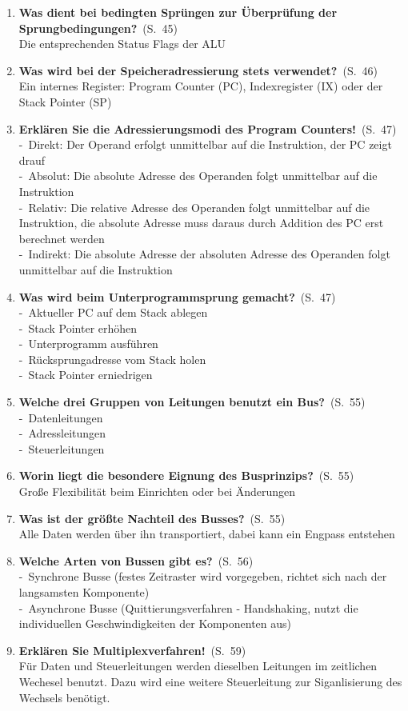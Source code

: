 \documentclass[a4paper,12pt]{article}
\newcommand{\question}[3]{\pagebreak[3]\item {\textbf{#1?}}\ (S.\ #2)#3}
\newcommand{\statement}[3]{\pagebreak[3]\item {\textbf{#1!}}\ (S.\ #2)#3}
\newcommand{\catchword}[1]{\\-\ #1}
\newcommand{\normaltext}[1]{\\#1}
\newcommand{\page}[1]{#1}
\begin{document}
\begin{enumerate}
  \question{Was dient bei bedingten Sprüngen zur Überprüfung der Sprungbedingungen}{\page{45}}
  {
    \normaltext{Die entsprechenden Status Flags der ALU}
  }

  \question{Was wird bei der Speicheradressierung stets verwendet}{\page{46}}
  {
    \normaltext{Ein internes Register: Program Counter (PC), Indexregister (IX)
                oder der Stack Pointer (SP)}
  }

  \statement{Erklären Sie die Adressierungsmodi des Program Counters}{\page{47}}
  {
    \catchword{Direkt: Der Operand erfolgt unmittelbar auf die Instruktion, der PC zeigt drauf}
    \catchword{Absolut: Die absolute Adresse des Operanden folgt unmittelbar auf die Instruktion}
    \catchword{Relativ: Die relative Adresse des Operanden folgt unmittelbar auf die Instruktion,
               die absolute Adresse muss daraus durch Addition des PC erst berechnet werden}
    \catchword{Indirekt: Die absolute Adresse der absoluten Adresse des Operanden folgt unmittelbar
               auf die Instruktion}
  }

  \question{Was wird beim Unterprogrammsprung gemacht}{\page{47}}
  {
    \catchword{Aktueller PC auf dem Stack ablegen}
    \catchword{Stack Pointer erhöhen}
    \catchword{Unterprogramm ausführen}
    \catchword{Rücksprungadresse vom Stack holen}
    \catchword{Stack Pointer erniedrigen}
  }

  \question{Welche drei Gruppen von Leitungen benutzt ein Bus}{\page{55}}
  {
    \catchword{Datenleitungen}
    \catchword{Adressleitungen}
    \catchword{Steuerleitungen}
  }

  \question{Worin liegt die besondere Eignung des Busprinzips}{\page{55}}
  {
    \normaltext{Große Flexibilität beim Einrichten oder bei Änderungen}
  }

  \question{Was ist der größte Nachteil des Busses}{\page{55}}
  {
    \normaltext{Alle Daten werden über ihn transportiert, dabei kann ein Engpass entstehen}
  }

    \question{Welche Arten von Bussen gibt es}{\page{56}}
  {
    \catchword{Synchrone Busse (festes Zeitraster wird vorgegeben, richtet sich nach der 
               langsamsten Komponente)}
    \catchword{Asynchrone Busse (Quittierungsverfahren - Handshaking, nutzt die individuellen
               Geschwindigkeiten der Komponenten aus)}
  }

  \statement{Erklären Sie Multiplexverfahren}{\page{59}}
  {
    \normaltext{Für Daten und Steuerleitungen werden dieselben Leitungen im zeitlichen Wechesel
                benutzt. Dazu wird eine weitere Steuerleitung zur Siganlisierung des Wechsels benötigt.}
  }


\end{enumerate}
\end{document}
